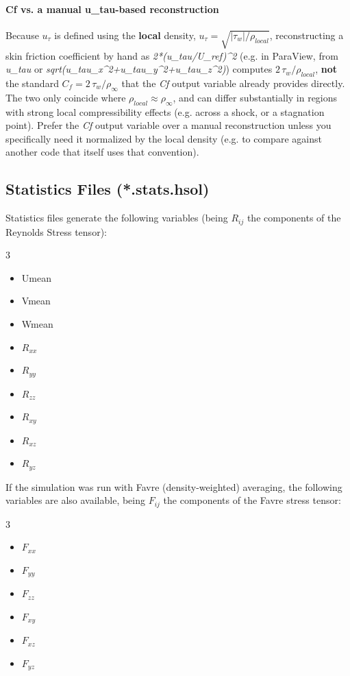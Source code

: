 \documentclass[a4paper,10pt]{report}
\begin{document}
\paragraph{Cf vs. a manual u\_tau-based reconstruction}

Because $u_\tau$ is defined using the \textbf{local} density, $u_\tau=\sqrt{|\tau_w|/\rho_{local}}$, reconstructing a skin friction coefficient by hand as \textit{2*(u\_tau/U\_ref)\textasciicircum2} (e.g. in ParaView, from \textit{u\_tau} or \textit{sqrt(u\_tau\_x\textasciicircum2+u\_tau\_y\textasciicircum2+u\_tau\_z\textasciicircum2)}) computes $2\,\tau_w/\rho_{local}$, \textbf{not} the standard $C_f = 2\,\tau_w/\rho_\infty$ that the \textit{Cf} output variable already provides directly. The two only coincide where $\rho_{local}\approx\rho_\infty$, and can differ substantially in regions with strong local compressibility effects (e.g. across a shock, or a stagnation point). Prefer the \textit{Cf} output variable over a manual reconstruction unless you specifically need it normalized by the local density (e.g. to compare against another code that itself uses that convention).

\subsection{Statistics Files (*.stats.hsol)}
Statistics files generate the following variables (being $R_{ij}$ the components of the Reynolds Stress tensor):

\begin{multicols}{3}
\begin{itemize}
\item Umean
\item Vmean
\item Wmean
\item $R_{xx}$
\item $R_{yy}$
\item $R_{zz}$
\item $R_{xy}$
\item $R_{xz}$
\item $R_{yz}$
\end{itemize}
\end{multicols}

If the simulation was run with Favre (density-weighted) averaging, the following variables are also available, being $F_{ij}$ the components of the Favre stress tensor:

\begin{multicols}{3}
\begin{itemize}
\item $F_{xx}$
\item $F_{yy}$
\item $F_{zz}$
\item $F_{xy}$
\item $F_{xz}$
\item $F_{yz}$
\end{itemize}
\end{multicols}
\end{document}
